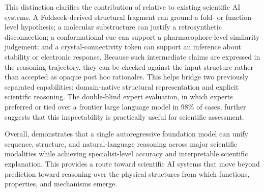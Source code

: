 This distinction clarifies the contribution of \projName{} relative to existing scientific AI systems.
A Foldseek-derived structural fragment can ground a fold- or function-level hypothesis; a molecular substructure can justify a retrosynthetic disconnection; a conformational cue can support a pharmacophore-level similarity judgement; and a crystal-connectivity token can support an inference about stability or electronic response.
Because such intermediate claims are expressed in the reasoning trajectory, they can be checked against the input structure rather than accepted as opaque post hoc rationales.
This helps bridge two previously separated capabilities: domain-native structural representation and explicit scientific reasoning.
The double-blind expert evaluation, in which experts preferred or tied \projName{} over a frontier large language model in 98\% of cases, further suggests that this inspectability is practically useful for scientific assessment.


 
 
 
 
 
 

Overall, \projName{} demonstrates that a single autoregressive foundation model can unify sequence, structure, and natural-language reasoning across major scientific modalities while achieving specialist-level accuracy and interpretable scientific explanation. 
This provides a route toward scientific AI systems that move beyond prediction toward reasoning over the physical structures from which functions, properties, and mechanisms emerge.